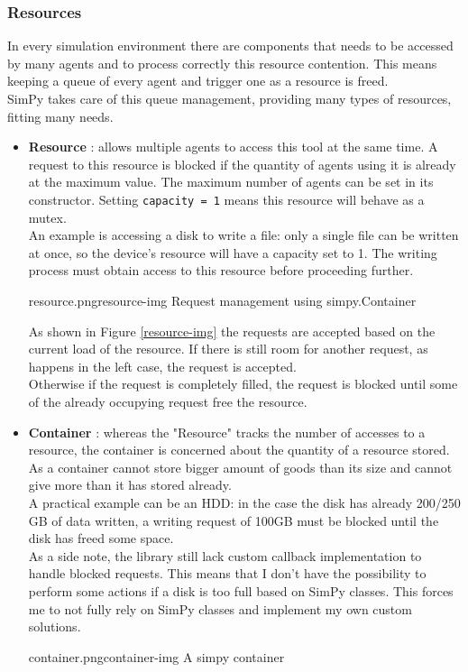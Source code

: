 \subsubsection*{Resources}
In every simulation environment there are components that needs to be accessed
by many agents and to process correctly this resource contention. This means
keeping a queue of every agent and trigger one as a resource is freed. \\
SimPy takes care of this queue management, providing many types of resources,
fitting many needs.
\begin{itemize}
    \item \textbf{Resource} \cite{simpy-resource}: 
        allows multiple agents to access this tool at the same time. A
        request to this resource is blocked if the quantity of agents using it
        is already at the maximum value. The maximum number of agents
        can be set in its constructor. Setting \texttt{capacity = 1} means this
        resource will behave as a mutex. \\
        An example is accessing a disk to write a file: only a single file can be
        written at once, so the device's resource will have a capacity set to 1.
        The writing process must obtain access to this resource before
        proceeding further. \\
        \begin{myimage}{resource.png}{resource-img}
            Request management using simpy.Container
        \end{myimage}
        As shown in Figure \ref{resource-img} the requests are accepted based on
        the current load of the resource. If there is still room for another
        request, as happens in the left case, the request is accepted. \\
        Otherwise if the request is completely filled, the request is blocked
        until some of the already occupying request free the resource.
    \item \textbf{Container} \cite{simpy-container}: whereas the "Resource"
        tracks the number of accesses to a resource, the container is concerned
        about the quantity of a resource stored. As a container cannot store
        bigger amount of goods than its size and cannot give more than it has
        stored already.  \\
        A practical example can be an HDD: in the case the disk has already
        200/250 GB of data written, a writing request of 100GB must be blocked
        until the disk has freed some space. \\
        As a side note, the library still lack custom callback implementation to
        handle blocked requests. This means that I don't have the possibility to
        perform some actions if a disk is too full based on SimPy classes. This
        forces me to not fully rely on SimPy classes and implement my own
        custom solutions. \\
        \begin{myimage}{container.png}{container-img}
            A simpy container
        \end{myimage}
\end{itemize}

